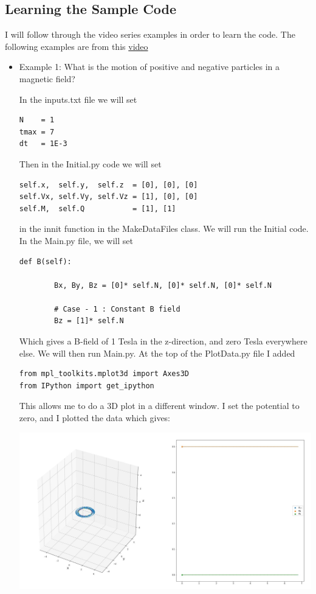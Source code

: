 \documentclass[12pt]{article}
\begin{document}
\subsection{Learning the Sample Code}
I will follow through the video series examples in order to learn the code. The following examples are from this \href{https://www.youtube.com/watch?v=UC5gy7bhAns&t=70s&ab_channel=PyPhy}{video}
\begin{itemize}
\item Example 1:
What is the motion of positive and negative particles in a magnetic field?

In the inputs.txt file we will set
\begin{verbatim}
N    = 1
tmax = 7
dt   = 1E-3
\end{verbatim}
Then in the Initial.py code we will set
\begin{verbatim}
self.x,  self.y,  self.z  = [0], [0], [0]
self.Vx, self.Vy, self.Vz = [1], [0], [0]
self.M,  self.Q           = [1], [1]
\end{verbatim}
in the innit function in the MakeDataFiles class. We will run the Initial code. In the Main.py file, we will set 
\begin{verbatim}
def B(self):
        
        Bx, By, Bz = [0]* self.N, [0]* self.N, [0]* self.N
        
        # Case - 1 : Constant B field
        Bz = [1]* self.N
\end{verbatim}
Which gives a B-field of 1 Tesla in the z-direction, and zero Tesla everywhere else. We will then run Main.py. At the top of the PlotData.py file I added 
\begin{verbatim}
from mpl_toolkits.mplot3d import Axes3D
from IPython import get_ipython
\end{verbatim}
This allows me to do a 3D plot in a different window. I set the potential to zero, and I plotted the data which gives:

\hspace{-1cm}\includegraphics[scale=0.35]{example1}


\end{itemize}
\end{document}
